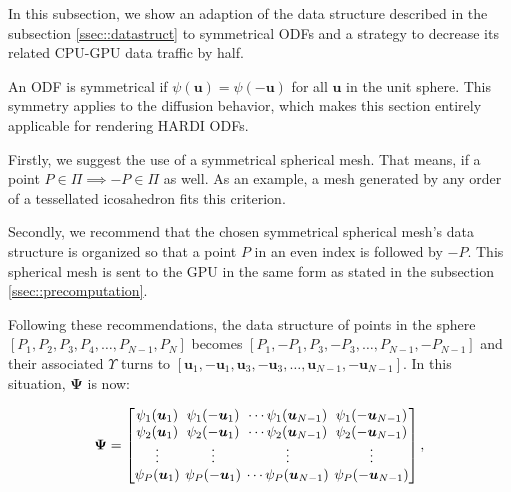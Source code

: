 \documentclass[twoside,twocolumn,10pt]{article}
\begin{document}
In this subsection, we show an adaption of the data structure described in the subsection \ref{ssec::datastruct} to symmetrical ODFs and a strategy to decrease its related CPU-GPU data traffic by half.

An ODF is symmetrical if $\psi(\bm{u}) = \psi(-\bm{u})$ for all $\bm{u}$ in the unit sphere. This symmetry applies to the diffusion behavior, which makes this section entirely applicable for rendering HARDI ODFs.%

Firstly, we suggest the use of a symmetrical spherical mesh. That means, if a point $P \in \Pi \implies -P \in \Pi$ as well. As an example, a mesh generated by any order of a tessellated icosahedron fits this criterion.

Secondly, we recommend that the chosen symmetrical spherical mesh's data structure is organized so that a point $P$ in an even index is followed by $-P$. This spherical mesh is sent to the GPU in the same form as stated in the subsection \ref{ssec::precomputation}.


Following these recommendations, the data structure of points in the sphere $[P_1, P_2, P_3, P_4, \dots, P_{N-1}, P_N]$ becomes $[P_1, -P_1, P_3, -P_3, \dots, P_{N-1}, -P_{N-1}]$ and their associated $\Upsilon$ turns to $[\bm{u}_1, -\bm{u}_1, \bm{u}_3, -\bm{u}_3, \dots, \bm{u}_{N-1}, -\bm{u}_{N-1}]$. In this situation, $\bm{\Psi}$ is now:

\begin{equation*}
\bm{\Psi} = 
\begingroup %
\setlength\arraycolsep{2pt}
\begin{bmatrix} 
    \psi_1(\bm{u}_1) & \psi_1(-\bm{u}_1) & \cdots \psi_1(\bm{u}_{N-1}) & \psi_1(-\bm{u}_{N-1})  \\
    
     \psi_2(\bm{u}_1)& \psi_2(-\bm{u}_1) & \cdots \psi_2(\bm{u}_{N-1}) & \psi_2(-\bm{u}_{N-1}) \\

    \vdots & \vdots & \vdots & \vdots  \\
    
     \psi_P(\bm{u}_1)&\psi_P(-\bm{u}_1) & \cdots \psi_P(\bm{u}_{N-1}) & \psi_P(-\bm{u}_{N-1})
    
\end{bmatrix},
\endgroup
\end{equation*}
\end{document}
